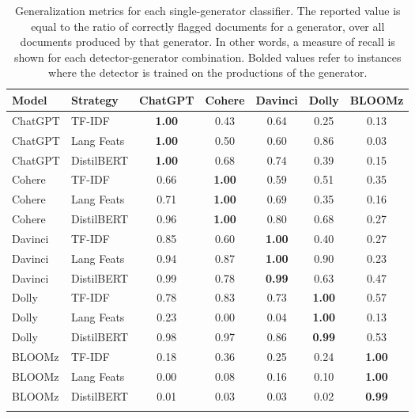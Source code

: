 \begin{table}[ht]
    \vspace{0.1cm}
    \centering
    \begin{tabular}{llccccc}
        \toprule
        Model   & Strategy   & ChatGPT       & Cohere        & Davinci       & Dolly         & BLOOMz        \\
        \midrule
        ChatGPT & TF-IDF     & \textbf{1.00} & 0.43          & 0.64          & 0.25          & 0.13          \\
        ChatGPT & Lang Feats & \textbf{1.00} & 0.50          & 0.60          & 0.86          & 0.03          \\
        ChatGPT & DistilBERT & \textbf{1.00} & 0.68          & 0.74          & 0.39          & 0.15          \\
        Cohere  & TF-IDF     & 0.66          & \textbf{1.00} & 0.59          & 0.51          & 0.35          \\
        Cohere  & Lang Feats & 0.71          & \textbf{1.00} & 0.69          & 0.35          & 0.16          \\
        Cohere  & DistilBERT & 0.96          & \textbf{1.00} & 0.80          & 0.68          & 0.27          \\
        Davinci & TF-IDF     & 0.85          & 0.60          & \textbf{1.00} & 0.40          & 0.27          \\
        Davinci & Lang Feats & 0.94          & 0.87          & \textbf{1.00} & 0.90          & 0.23          \\
        Davinci & DistilBERT & 0.99          & 0.78          & \textbf{0.99} & 0.63          & 0.47          \\
        Dolly   & TF-IDF     & 0.78          & 0.83          & 0.73          & \textbf{1.00} & 0.57          \\
        Dolly   & Lang Feats & 0.23          & 0.00          & 0.04          & \textbf{1.00} & 0.13          \\
        Dolly   & DistilBERT & 0.98          & 0.97          & 0.86          & \textbf{0.99} & 0.53          \\
        BLOOMz  & TF-IDF     & 0.18          & 0.36          & 0.25          & 0.24          & \textbf{1.00} \\
        BLOOMz  & Lang Feats & 0.00          & 0.08          & 0.16          & 0.10          & \textbf{1.00} \\
        BLOOMz  & DistilBERT & 0.01          & 0.03          & 0.03          & 0.02          & \textbf{0.99} \\
        \bottomrule
        \vspace{0.1cm}
    \end{tabular}
    \caption{
        Generalization metrics for each single-generator classifier.
        The reported value is equal to the ratio of correctly flagged documents for a generator, over all documents produced by that generator.
        In other words, a measure of recall is shown for each detector-generator combination.
        Bolded values refer to instances where the detector is trained on the productions of the generator.
    }
    \label{tab:generalization}
\end{table}

